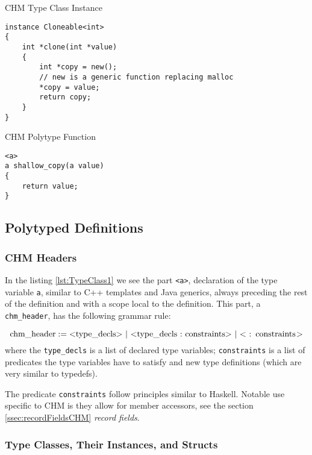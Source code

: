 \begin{listing}
\caption{CHM Type Class Instance}
\label{lst:Instance}
\begin{lstlisting}
instance Cloneable<int>
{
    int *clone(int *value)
    {
        int *copy = new();
        // new is a generic function replacing malloc
        *copy = value;
        return copy;
    }
}
\end{lstlisting}
\end{listing}

\begin{listing}
\caption{CHM Polytype Function}
\label{lst:Function}
\begin{lstlisting}
<a>
a shallow_copy(a value)
{
    return value;
}
\end{lstlisting}
\end{listing}

\subsection{Polytyped Definitions}

\subsubsection{CHM Headers}
In the listing \ref{lst:TypeClass1} we see the part \lstinline{<a>}, declaration of the type variable \lstinline{a}, similar to C++ templates and Java generics, always preceding the rest of the definition and with a scope local to the definition. This part, a \lstinline{chm_header}, has the following grammar rule:

\begin{defn}
    $$\text{\lstinline{chm_header}} := \text{\lstinline{<type_decls>}}\ |\ \text{\lstinline{<type_decls : constraints>}}\ |\ \text{\lstinline{< : constraints>}}$$
    where the \lstinline{type_decls} is a list of declared type variables; \lstinline{constraints} is a list of predicates the type variables have to satisfy and new type definitions (which are very similar to typedefs).
\end{defn}

The predicate \lstinline{constraints} follow principles similar to Haskell. Notable use specific to CHM is they allow for member accessors, see the section \ref{ssec:recordFieldsCHM} \emph{record fields}.

\subsubsection{Type Classes, Their Instances, and Structs}

